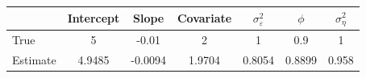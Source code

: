 \begin{tabular}{lcccccc}
\toprule
& Intercept & Slope & Covariate & $\sigma_\varepsilon^2$ & $\phi$ & $\sigma_\eta^2$ \\
\midrule
True & 5 & -0.01 & 2 & 1 & 0.9 & 1 \\
Estimate & 4.9485 & -0.0094 & 1.9704 & 0.8054 & 0.8899 & 0.958 \\
\bottomrule
\end{tabular}
